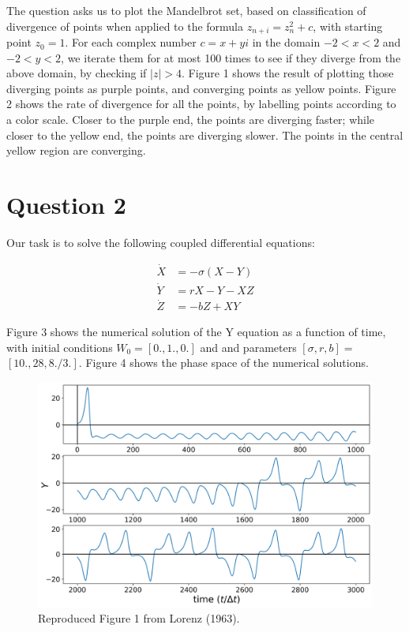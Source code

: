 \documentclass[12pt]{article}
\begin{document}
The question asks us to plot the Mandelbrot set, based on classification of divergence of points when applied to the formula $z_{n+i} = z^2_n + c$, with starting point $z_0 = 1$. For each complex number $c = x + yi$ in the domain $-2 < x < 2$ and $-2 < y < 2$, we iterate them for at most 100 times to see if they diverge from the above domain, by checking if $|z| > 4$. Figure 1 shows the result of plotting those diverging points as purple points, and converging points as yellow points. Figure 2 shows the rate of divergence for all the points, by labelling points according to a color scale. Closer to the purple end, the points are diverging faster; while closer to the yellow end, the points are diverging slower. The points in the central yellow region are converging.


\section{Question 2}

Our task is to solve the following coupled differential equations:

$$
\begin{aligned}
\dot{X} &=-\sigma(X-Y) \\
\dot{Y} &=r X-Y-X Z \\
\dot{Z} &=-b Z+X Y
\end{aligned}
$$

Figure 3 shows the numerical solution of the Y equation as a function of time, with initial conditions $W_{0}=[0 ., 1 ., 0 .]$ and  and parameters $[\sigma, r, b]=$ $[10 ., 28,8 . / 3 .]$. Figure 4 shows the phase space of the numerical solutions.

\begin{figure}[H]
    \centering
    \includegraphics[scale = 0.6]{Figure_3.png}
    \caption{Reproduced Figure 1 from Lorenz (1963).}
\end{figure}
\end{document}
